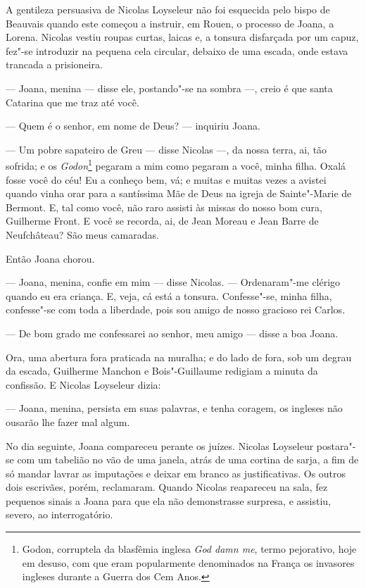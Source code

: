 A gentileza persuasiva de Nicolas Loyseleur não foi esquecida pelo bispo de
Beauvais quando este começou a instruir, em Rouen, o processo de Joana, a
Lorena. Nicolas vestiu roupas curtas, laicas e, a tonsura disfarçada por
um capuz, fez"-se introduzir na pequena cela circular, debaixo de uma
escada, onde estava trancada a prisioneira.

--- Joana, menina --- disse ele, postando"-se na sombra ---, creio é que santa
Catarina que me traz até você.

--- Quem é o senhor, em nome de Deus? --- inquiriu Joana.

--- Um pobre sapateiro de Greu --- disse Nicolas ---, da nossa terra, ai, tão
sofrida; e os \textit{Godon}\footnote{ Godon, corruptela da blasfêmia
inglesa \textit{God damn me}, termo pejorativo, hoje em desuso, com que
eram popularmente denominados na França os invasores ingleses durante a
Guerra dos Cem Anos.} pegaram a mim como pegaram a você, minha
filha. Oxalá fosse você do céu! Eu a conheço bem, vá; e muitas e muitas
vezes a avistei quando vinha orar para a santíssima Mãe de Deus na igreja
de Sainte"-Marie de Bermont. E, tal como você, não raro assisti às missas
do nosso bom cura, Guilherme Front. E você se recorda, ai, de Jean Moreau
e Jean Barre de Neufchâteau? São meus camaradas.

Então Joana chorou.

--- Joana, menina, confie em mim --- disse Nicolas. --- Ordenaram"-me clérigo quando
eu era criança. E, veja, cá está a tonsura. Confesse"-se, minha filha,
confesse"-se com toda a liberdade, pois sou amigo de nosso gracioso rei
Carlos.

--- De bom grado me confessarei ao senhor, meu amigo --- disse a boa Joana.

Ora, uma abertura fora praticada na muralha; e do lado de fora, sob um
degrau da escada, Guilherme Manchon e Bois"-Guillaume redigiam a minuta da
confissão. E Nicolas Loyseleur dizia:

--- Joana, menina, persista em suas palavras, e tenha coragem, os ingleses
não ousarão lhe fazer mal algum.

No dia seguinte, Joana compareceu perante os juízes. Nicolas Loyseleur
postara"-se com um tabelião no vão de uma janela, atrás de uma cortina de
sarja, a fim de só mandar lavrar as imputações e deixar em branco as
justificativas. Os outros dois escrivães, porém, reclamaram. Quando
Nicolas reapareceu na sala, fez pequenos sinais a Joana para que ela não
demonstrasse surpresa, e assistiu, severo, ao interrogatório.

